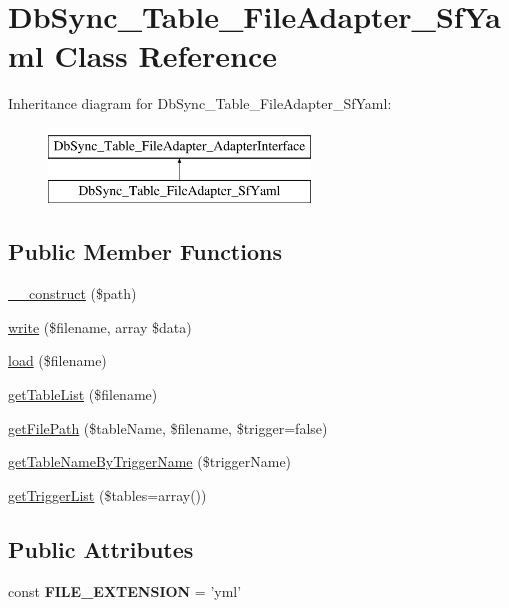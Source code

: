 \hypertarget{classDbSync__Table__FileAdapter__SfYaml}{
\section{DbSync\_\-Table\_\-FileAdapter\_\-SfYaml Class Reference}
\label{classDbSync__Table__FileAdapter__SfYaml}
}
Inheritance diagram for DbSync\_\-Table\_\-FileAdapter\_\-SfYaml:\begin{figure}[H]
\begin{center}
\leavevmode
\includegraphics[height=2.000000cm]{classDbSync__Table__FileAdapter__SfYaml}
\end{center}
\end{figure}
\subsection*{Public Member Functions}
\begin{DoxyCompactItemize}
\item 
\hyperlink{classDbSync__Table__FileAdapter__SfYaml_a0db952aba37ea06d1bed4881011307f1}{\_\-\_\-construct} (\$path)
\item 
\hyperlink{classDbSync__Table__FileAdapter__SfYaml_aa8caeb02484d82c83c039182835bba36}{write} (\$filename, array \$data)
\item 
\hyperlink{classDbSync__Table__FileAdapter__SfYaml_a0154b63bba21856ca41eabb803fc4507}{load} (\$filename)
\item 
\hyperlink{classDbSync__Table__FileAdapter__SfYaml_af17a46ddc000204d030e5006343a2203}{getTableList} (\$filename)
\item 
\hyperlink{classDbSync__Table__FileAdapter__SfYaml_acbd1d98e3183071612a04d29203215d9}{getFilePath} (\$tableName, \$filename, \$trigger=false)
\item 
\hyperlink{classDbSync__Table__FileAdapter__SfYaml_a360f51573495d1eab1a11c0d4984e44c}{getTableNameByTriggerName} (\$triggerName)
\item 
\hyperlink{classDbSync__Table__FileAdapter__SfYaml_a3fd272e1ff3162bf1b8decfe5d246103}{getTriggerList} (\$tables=array())
\end{DoxyCompactItemize}
\subsection*{Public Attributes}
\begin{DoxyCompactItemize}
\item 
\hypertarget{classDbSync__Table__FileAdapter__SfYaml_a49fe43bb98940e9b937ccf01d9c078c7}{
const {\bfseries FILE\_\-EXTENSION} = 'yml'}
\label{classDbSync__Table__FileAdapter__SfYaml_a49fe43bb98940e9b937ccf01d9c078c7}

\end{DoxyCompactItemize}
